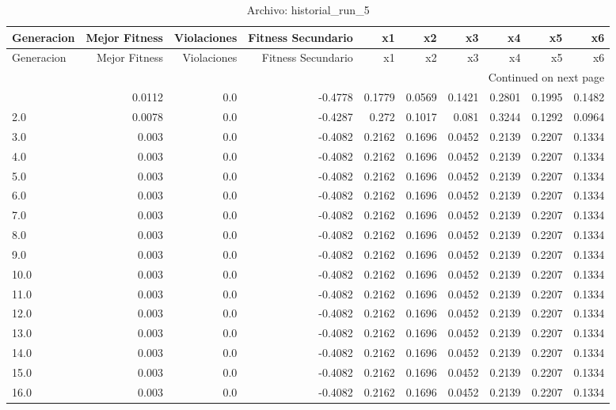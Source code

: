 \begin{longtable}{lrrrrrrrrr}
\caption{Archivo: historial\_run\_5}\label{tab:historial_run_5} \\
\toprule
Generacion & Mejor Fitness & Violaciones & Fitness Secundario & x1 & x2 & x3 & x4 & x5 & x6 \\
\midrule
\endfirsthead
\toprule
Generacion & Mejor Fitness & Violaciones & Fitness Secundario & x1 & x2 & x3 & x4 & x5 & x6 \\
\midrule
\endhead
\midrule
\multicolumn{10}{r}{Continued on next page} \\
\midrule
\endfoot
\bottomrule
\endlastfoot
1.0 & 0.0112 & 0.0 & -0.4778 & 0.1779 & 0.0569 & 0.1421 & 0.2801 & 0.1995 & 0.1482 \\
2.0 & 0.0078 & 0.0 & -0.4287 & 0.272 & 0.1017 & 0.081 & 0.3244 & 0.1292 & 0.0964 \\
3.0 & 0.003 & 0.0 & -0.4082 & 0.2162 & 0.1696 & 0.0452 & 0.2139 & 0.2207 & 0.1334 \\
4.0 & 0.003 & 0.0 & -0.4082 & 0.2162 & 0.1696 & 0.0452 & 0.2139 & 0.2207 & 0.1334 \\
5.0 & 0.003 & 0.0 & -0.4082 & 0.2162 & 0.1696 & 0.0452 & 0.2139 & 0.2207 & 0.1334 \\
6.0 & 0.003 & 0.0 & -0.4082 & 0.2162 & 0.1696 & 0.0452 & 0.2139 & 0.2207 & 0.1334 \\
7.0 & 0.003 & 0.0 & -0.4082 & 0.2162 & 0.1696 & 0.0452 & 0.2139 & 0.2207 & 0.1334 \\
8.0 & 0.003 & 0.0 & -0.4082 & 0.2162 & 0.1696 & 0.0452 & 0.2139 & 0.2207 & 0.1334 \\
9.0 & 0.003 & 0.0 & -0.4082 & 0.2162 & 0.1696 & 0.0452 & 0.2139 & 0.2207 & 0.1334 \\
10.0 & 0.003 & 0.0 & -0.4082 & 0.2162 & 0.1696 & 0.0452 & 0.2139 & 0.2207 & 0.1334 \\
11.0 & 0.003 & 0.0 & -0.4082 & 0.2162 & 0.1696 & 0.0452 & 0.2139 & 0.2207 & 0.1334 \\
12.0 & 0.003 & 0.0 & -0.4082 & 0.2162 & 0.1696 & 0.0452 & 0.2139 & 0.2207 & 0.1334 \\
13.0 & 0.003 & 0.0 & -0.4082 & 0.2162 & 0.1696 & 0.0452 & 0.2139 & 0.2207 & 0.1334 \\
14.0 & 0.003 & 0.0 & -0.4082 & 0.2162 & 0.1696 & 0.0452 & 0.2139 & 0.2207 & 0.1334 \\
15.0 & 0.003 & 0.0 & -0.4082 & 0.2162 & 0.1696 & 0.0452 & 0.2139 & 0.2207 & 0.1334 \\
16.0 & 0.003 & 0.0 & -0.4082 & 0.2162 & 0.1696 & 0.0452 & 0.2139 & 0.2207 & 0.1334 \\

\end{longtable}
